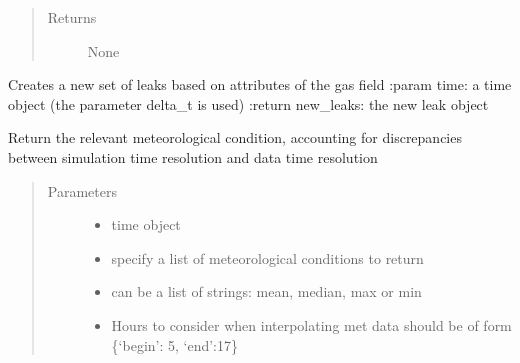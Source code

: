 \documentclass[letterpaper,10pt,english]{sphinxmanual}
\begin{document}
\begin{fulllineitems}
\begin{fulllineitems}
\begin{quote}
\begin{description}
\item[{Returns}] \leavevmode
None

\end{description}\end{quote}

\end{fulllineitems}


\begin{fulllineitems}
\label{\detokenize{index:feast.EmissionSimModules.infrastructure_classes.GasField.emission_size_maker}}
Creates a new set of leaks based on attributes of the gas field
:param time: a time object (the parameter delta\_t is used)
:return new\_leaks: the new leak object

\end{fulllineitems}


\begin{fulllineitems}
\label{\detokenize{index:feast.EmissionSimModules.infrastructure_classes.GasField.get_met}}
Return the relevant meteorological condition, accounting for discrepancies between simulation time resolution
and data time resolution
\begin{quote}\begin{description}
\item[{Parameters}] \leavevmode\begin{itemize}
\item {} 
 \textendash{} time object

\item {} 
 \textendash{} specify a list of meteorological conditions to return

\item {} 
 \textendash{} can be a list of strings: mean, median, max or min

\item {} 
 \textendash{} Hours to consider when interpolating met data should be of form \{‘begin’: 5, ‘end’:17\}


\end{itemize}
\end{description}
\end{quote}
\end{fulllineitems}
\end{fulllineitems}
\end{document}
